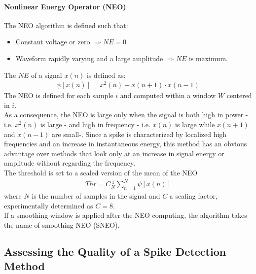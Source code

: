\paragraph{Nonlinear Energy Operator (NEO)}
The NEO algorithm is defined such that:
\begin{itemize}
    \item Constant voltage or zero \(\Rightarrow NE=0\)
    \item Waveform rapidly varying and a large amplitude \(\Rightarrow NE \text{ is maximum}\).
\end{itemize}
The \(NE\) of a signal \(x(n)\) is defined as:
\begin{align*}
    \psi[x(n)]=x^2(n)-x(n+1)\cdot x(n-1)
\end{align*}
The NEO is defined for each sample \(i\) and computed within a
window \(W\) centered in \(i\).\\
As a consequence, the NEO is large only when the signal is both high in power - i.e. \(x^2(n)\) is large -
and high in frequency - i.e. \(x(n)\) is large while \(x(n+1)\) and \(x(n-1)\) are small-.
Since a spike is characterized by localized high frequencies and an increase in instantaneous energy,
this method has an obvious advantage over methods that look only at an increase in signal energy or
amplitude without regarding the frequency.\\
The threshold is set to a scaled version of the mean of the NEO
\begin{align*}
    Thr=C\frac{1}{N}\sum_{n=1}^{N}\psi[x(n)]
\end{align*}
where \(N\) is the number of samples in the signal and \(C\) a scaling factor,
experimentally determined as \(C=8\).\\
If a smoothing window is applied after the NEO computing, the algorithm takes the name of smoothing NEO (SNEO).

\subsection{Assessing the Quality of a Spike Detection Method}
